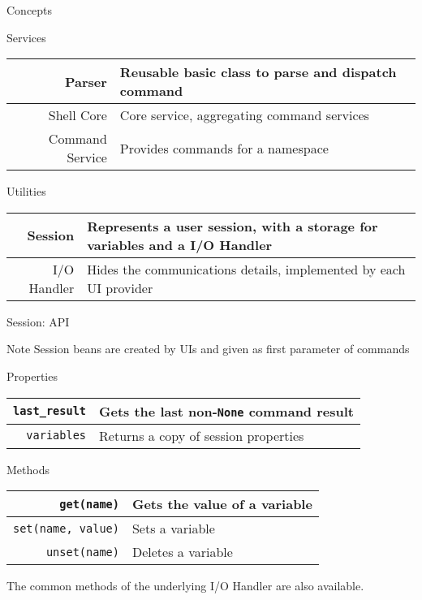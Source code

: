 \begin{frame}{Concepts}
\begin{small}
\begin{block}{Services}
\centering
\begin{tabular}{r p{}}
Parser & Reusable basic class to parse and dispatch command \\
\hline
Shell Core & Core service, aggregating command services \\
\hline
Command Service & Provides commands for a namespace \\
\end{tabular}
\end{block}

\begin{block}{Utilities}
\centering
\begin{tabular}{r p{}}
Session & Represents a user session, with a storage for variables and a I/O Handler \\
\hline
I/O Handler & Hides the communications details, \newline implemented by each UI provider \\
\end{tabular}
\end{block}
\end{small}
\end{frame}

\begin{frame}{Session: API}
\begin{small}
\begin{exampleblock}{Note}
Session beans are created by UIs and given as first parameter of commands
\end{exampleblock}

\begin{block}{Properties}
\centering
\begin{tabular}{rl}
\texttt{last\_result} & Gets the last non-\texttt{None} command result \\
\hline
\texttt{variables} & Returns a copy of session properties \\
\end{tabular}
\end{block}

\begin{block}{Methods}
\begin{center}
\begin{tabular}{rl}
\texttt{get({\scriptsize name})} & Gets the value of a variable \\
\hline
\texttt{set({\scriptsize name, value})} & Sets a variable \\
\hline
\texttt{unset({\scriptsize name})} & Deletes a variable \\
\end{tabular}
\end{center}
The common methods of the underlying I/O Handler are also available.
\end{block}
\end{small}
\end{frame}



